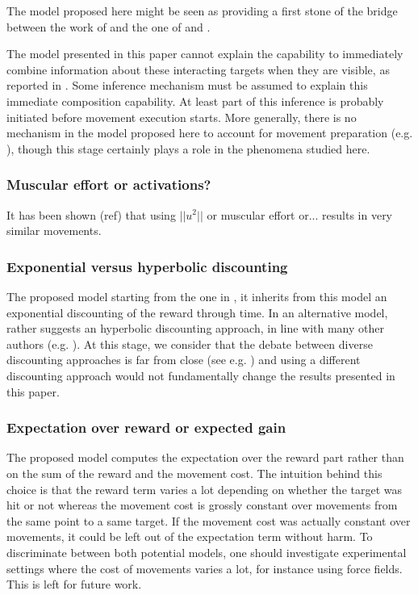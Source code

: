 \documentclass[10pt]{article}
\begin{document}
The model proposed here  might be seen as providing a first stone of the bridge between the work of \cite{Trommershauser2003a,Trommershauser2005} and the one of \cite{shadmehr10} and \cite{rigoux12}.

The model presented in this paper cannot explain the capability to immediately combine information about these interacting targets when they are visible, as reported in \cite{Trommershauser2009}. Some inference mechanism must be assumed to explain this immediate composition capability.
At least part of this inference is probably initiated before movement execution starts.
More generally, there is no mechanism in the model proposed here to account for movement preparation (e.g. \cite{cos11}),
though this stage certainly plays a role in the phenomena studied here.

\subsubsection{Muscular effort or activations?}

It has been shown (ref) that using $||u^2||$ or muscular effort or... results in very similar movements.

\subsubsection{Exponential versus hyperbolic discounting}

The proposed model starting from the one in \cite{rigoux12}, it inherits from this model an exponential discounting of the reward through time. In an alternative model, \cite{shadmehr10} rather suggests
an hyperbolic discounting approach, in line with many other authors (e.g. \cite{prevost10}).
At this stage, we consider that the debate between diverse discounting approaches is far from
close (see e.g. \cite{green96}) and using a different discounting approach would not
fundamentally change the results presented in this paper.

\subsubsection{Expectation over reward or expected gain}

The proposed model computes the expectation over the reward part rather than on the sum of the reward and the movement cost. The intuition behind this choice is that the reward term varies a lot depending on whether the target was hit or not whereas the movement cost is grossly constant over movements from the same point to a same target. If the movement cost was actually constant over movements, it could be left out of the expectation term without harm. To discriminate between both potential models, one should investigate experimental settings where the cost of movements varies a lot, for instance using force fields. This is left for future work.
\end{document}
